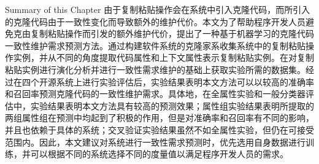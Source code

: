 
{Summary of this Chapter}
由于复制粘贴操作会在系统中引入克隆代码，而所引入的克隆代码由于一致性变化而导致额外的维护代价。本文为了帮助程序开发人员避免克由复制粘贴操作而引发的额外维护代价，提出了一种基于机器学习的克隆代码一致性维护需求预测方法。通过构建软件系统的克隆家系收集系统中的复制粘贴操作实例，并从不同的角度提取代码属性和上下文属性表示复制粘贴实例。在对复制粘贴实例进行演化分析并进行一致性需求维护的基础上获取实验所需的数据集。经过在四个开源系统上进行实验评估后，实验结果表明本文方法可以以较高的准确率和召回率预测克隆代码的一致性维护需求。具体地，在全属性实验和一般分类器评估中，实验结果表明本文方法具有较高的预测效果；属性组实验结果表明所提取的两组属性组在预测中均起到了积极的作用，但是对准确率和召回率有不同的影响，并且也依赖于具体的系统；交叉验证实验结果虽然不如全属性实验，但仍在可接受范围内。因此，本文建议对系统进行一致性需求预测时，优先选用自身数据进行训练，并可以根据不同的系统选择不同的度量值以满足程序开发人员的需求。

